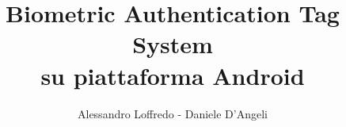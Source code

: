 \documentclass[12pt,a4paper,oneside]{article}
\title{Biometric Authentication Tag System \\ su piattaforma Android}
\author{Alessandro Loffredo - Daniele D'Angeli}
\begin{document}
\maketitle

\pagebreak

\tableofcontents
\pagebreak





\end{document}
